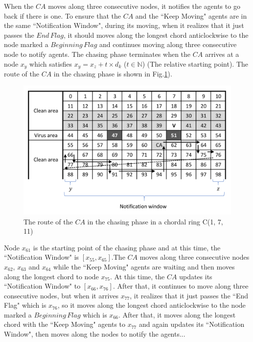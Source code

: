 When the $CA$ moves along three consecutive nodes, it notifies the agents to go back if there is one. To ensure that the $CA$ and the ``Keep Moving" agents are in the same ``Notification Window", during its moving, when it realizes that it just passes the $End\,Flag$, it should moves along the longest chord anticlockwise to the node marked a $Beginning\,Flag$ and continues moving along three consecutive node to notify agents. The chasing phase terminates when the $CA$ arrives at a  node $x_y$ which satisfies $x_y=x_z+t\times{d_k}$ ($t\in \mathbb{N}$) (The relative starting point). The route of the $CA$ in the chasing phase is shown in Fig.\ref{fig:chasing}). 
\begin{figure}[H]
  \centering  
  \includegraphics[width=1.0\textwidth]{figures/chasing.png}
  \caption{The route of the $CA$ in the chasing phase in a chordal ring C(1, 7, 11)}\label{fig:chasing}
\end{figure}

Node $x_{61}$ is the starting point of the chasing phase and at this time, the ``Notification Window" is $[x_{55}, x_{65}]$.The $CA$ moves along three consecutive nodes $x_{62}$, $x_{63}$ and $x_{64}$ while the ``Keep Moving" agents are waiting and then moves along the longest chord to node $x_{75}$. At this time, the $CA$ updates its ``Notification Window" to $[x_{66}, x_{76}]$. After that, it continues to move along three consecutive nodes, but when it arrives $x_{77}$, it realizes that it just passes the ``End Flag" which is $x_{76}$, so it moves along the longest chord  anticlockwise to the node marked a $Beginning\,Flag$ which is $x_{66}$. After that, it moves along the longest chord with the ``Keep Moving" agents to $x_{77}$ and again updates its ``Notification Window", then moves along the nodes to notify the agents...

